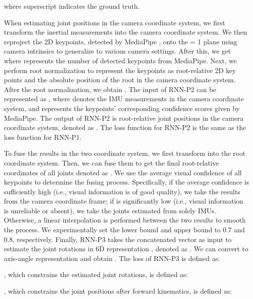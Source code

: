 \documentclass[sigconf,nonacm=true]{acmart}
\begin{document}
where superscript  indicates the ground truth.
\par
When estimating joint positions in the camera coordinate system, we first transform the inertial measurements into the camera coordinate system.
We then reproject the 2D keypoints, detected by MediaPipe \cite{mediapipe}, onto the  = 1 plane using camera intrinsics to generalize to various camera settings.
After this, we get  where  represents the number of detected keypoints from MediaPipe.
Next, we perform root normalization to represent the keypoints as root-relative 2D key points and the absolute position of the root in the camera coordinate system.
After the root normalization, we obtain .
The input of RNN-P2 can be represented as , where  denotes the IMU measurements in the camera coordinate system, and  represents the keypoints' corresponding confidence scores given by MediaPipe.
The output of RNN-P2 is root-relative joint positions in the camera coordinate system, denoted as .
The loss function for RNN-P2 is the same as the loss function for RNN-P1.
\par
To fuse the results in the two coordinate system, we first transform  into the root coordinate system.
Then, we can fuse them to get the final root-relative coordinates of all joints denoted as .
We use the average visual confidence of all keypoints  to determine the fusing process.
Specifically, if the average confidence  is sufficiently high (i.e., visual information is of good quality), we take the results from the camera coordinate frame;
if  is significantly low (i.e., visual information is unreliable or absent), we take the joints estimated from solely IMUs.
Otherwise, a linear interpolation is performed between the two results to smooth the process.
We experimentally set the lower bound and upper bound to 0.7 and 0.8, respectively.
Finally, RNN-P3 takes the concatenated vector  as input to estimate the joint rotations in 6D representation \cite{zhou2019continuity}, denoted as .
We can convert  to axis-angle representation and obtain .
The loss of RNN-P3 is defined as:

, which constrains the estimated joint rotations, is defined as:

, which constrains the joint positions after forward kinematics, is defined as: 
\end{document}
